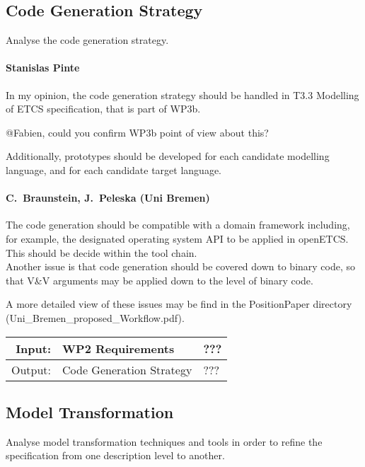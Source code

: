 \documentclass[11pt, a4paper]{article}
\newenvironment{inoutput}
{\vspace{2mm}
\noindent
\begin{tabular}{|r|p{.7\linewidth}|l|}
\hline}
{
\hline
\end{tabular}}
\begin{document}
\subsection{Code Generation Strategy}

Analyse the code generation strategy.

\paragraph{Stanislas Pinte}
In my opinion, the code generation strategy should be handled in T3.3 Modelling of ETCS specification, that is part of WP3b.

@Fabien, could you confirm WP3b point of view about this? 

Additionally, prototypes should be developed for each candidate modelling language, and for each candidate target language. 
\paragraph{C.~Braunstein, J.~Peleska (Uni Bremen)}
The code generation should be compatible with a domain framework including, for
example, the designated operating system API to be applied in openETCS. This
should be decide within the tool chain. \\
Another issue is that code generation should be covered down to binary code, so that V\&V arguments
may be applied down to the level of binary code.

A more detailed view of these issues may be find in the PositionPaper directory
(Uni\_Bremen\_proposed\_Workflow.pdf).\\




\begin{inoutput}
Input: & WP2 Requirements & ??? \\
\hline
Output: & Code Generation Strategy & ??? \\
\end{inoutput}

\subsection{Model Transformation}

Analyse model transformation techniques and tools in order to refine the specification from one description level to another.
\end{document}
